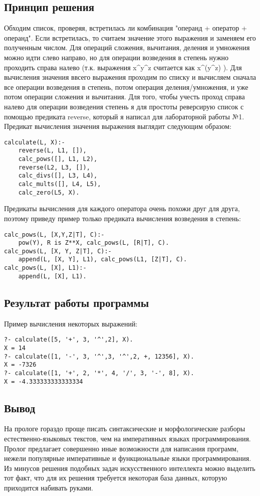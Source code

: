 \documentclass[12pt]{article}
\begin{document}
\subsection*{Принцип решения}
Обходим список, проверяя, встретилась ли комбинация "операнд + оператор + операнд". Если встретилась, то считаем значение этого выражения и заменяем его полученным числом. Для операций сложения, вычитания, деления и умножения можно идти слево направо, но для операции возведения в степень нужно проходить справа налево (т.к. выражения x\^{}y\^{}z считается как x\^{}(y\^{}z) ). Для вычисления значения ввсего выражения проходим по списку и
вычисляем сначала все операции возведения в степень, потом операция деления/умножения, 
и уже потом операции сложения и вычитания. Для того, чтобы учесть проход справа налево
для операции возведения степень я для простоты реверсирую список с помощью предиката reverse, который я написал для лабораторной работы №1. Предикат вычисления значения выражения выглядит следующим образом:
\begin{lstlisting}
calculate(L, X):-
    reverse(L, L1, []),
    calc_pows([], L1, L2),
    reverse(L2, L3, []),
    calc_divs([], L3, L4),
    calc_mults([], L4, L5), 
    calc_zero(L5, X).
\end{lstlisting}
Предикаты вычисления для каждого оператора очень похожи друг для друга, поэтому приведу пример только предиката вычисления возведения в степень:
\begin{lstlisting}
calc_pows(L, [X,Y,Z|T], C):-
    pow(Y), R is Z**X, calc_pows(L, [R|T], C).
calc_pows(L, [X, Y, Z|T], C):-
    append(L, [X, Y], L1), calc_pows(L1, [Z|T], C).
calc_pows(L, [X], L1):- 
    append(L, [X], L1).
\end{lstlisting}
\subsection*{Результат работы программы}
Пример вычисления некоторых выражений:
\begin{lstlisting}
?- calculate([5, '+', 3, '^',2], X).
X = 14
?- calculate([1, '-', 3, '^',3, '^',2, +, 12356], X).
X = -7326
?- calculate([1, '+', 2, '*', 4, '/', 3, '-', 8], X).
X = -4.333333333333334
\end{lstlisting}
\subsection*{Вывод}
На прологе гораздо проще писать синтаксические и морфологические разборы естественно-языковых текстов, чем на императивных языках программирования. Пролог предлагает совершенно иные возможности для написания программ, нежели популярные императивные и функциональные языки программирования. Из минусов решения подобных задач искусственного интеллекта можно выделить тот факт, что для их решения требуется некоторая база данных, которую приходится набивать руками.
\end{document}
